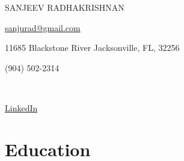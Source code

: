 \documentclass{article}
\newcommand\midtextbox[1]{%
  \parbox{.6\textwidth}{#1}%
}
\newcommand\outtextbox[1]{%
  \parbox{.2\textwidth}{#1}%
}
\newenvironment{TitleCenter}[1][\topsep]
  {\setlength{\topsep}{#1}\par\kern\topsep\centering}%
  {\par\kern\topsep}%
\begin{document}
\thispagestyle{empty}

\begin{TitleCenter}[0em]
\bfseries\huge

SANJEEV RADHAKRISHNAN
\end{TitleCenter}
\noindent\outtextbox{\href{sanjurad@gmail.com}{sanjurad@gmail.com}\hfill}\midtextbox{\hfil11685 Blackstone River Jacksonville, FL, 32256\hfil}\outtextbox{\hfill (904) 502-2314} \\
\noindent\outtextbox{\href{linkedin.com/in/sanjeev-radhakrishnan}{LinkedIn}\hfill}\midtextbox{\hfil\hfil}\outtextbox{\hfill}


\vspace{-1em}
\section{Education}
\end{document}
